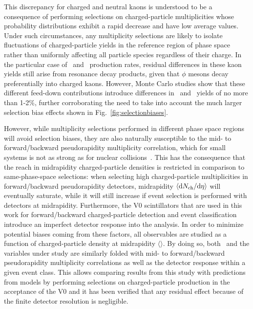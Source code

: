 This discrepancy for charged and neutral kaons is understood to be a consequence of performing selections on charged-particle multiplicities whose 
probability distributions exhibit a rapid decrease and have low 
average values. Under such circumstances, any multiplicity selections are likely to isolate fluctuations of charged-particle yields in the reference region of 
phase space rather than uniformly affecting all particle species regardless of their charge. In the particular case of \kapm\ and \kzero\ production rates, residual 
differences in these kaon yields still arise from resonance decay products, given that $\phi$ mesons decay preferentially into charged kaons. 
However, Monte Carlo studies show that these different feed-down contributions introduce differences in \kapm\ and \kzero\ yields of no more than 1-2\%, further corroborating 
the need to take into account the much larger selection bias effects shown in Fig.~\ref{fig:selectionbiases}. 

However, while multiplicity selections performed in different phase space regions will avoid selection biases, they are also naturally susceptible to the mid- to 
forward/backward pseudorapidity multiplicity correlation, which for small systems is not as strong as for nuclear collisions~\cite{PhysRevC.91.064905}. 
This has the 
consequence that the reach in midrapidity charged-particle densities is restricted in comparison to same-phase-space selections: when selecting high charged-particle
multiplicities in forward/backward pseudorapidity detectors, midrapidity $\langle {\rm d }N_{\rm ch}/{\rm d }\eta \rangle$ will eventually saturate, while it will still increase 
if event selection is performed with detectors at midrapidity. 
Furthermore, the V0 scintillators
that are used in this work for forward/backward charged-particle detection and event classification introduce an imperfect detector response into the analysis. In order
to minimize potential biases coming from these factors, 
all observables are studied as a function of charged-particle density at midrapidity $\langle$\dNdeta$\rangle$. By doing so, both \dNdeta\ and 
the variables under study are similarly folded with mid- to forward/backward pseudorapidity multiplicity correlations as well as the detector response within a given event class. 
This allows comparing results from this study with predictions from models by performing selections on charged-particle production in 
the acceptance of the V0 and it has been verified that any residual effect because of the finite detector resolution is negligible. 
